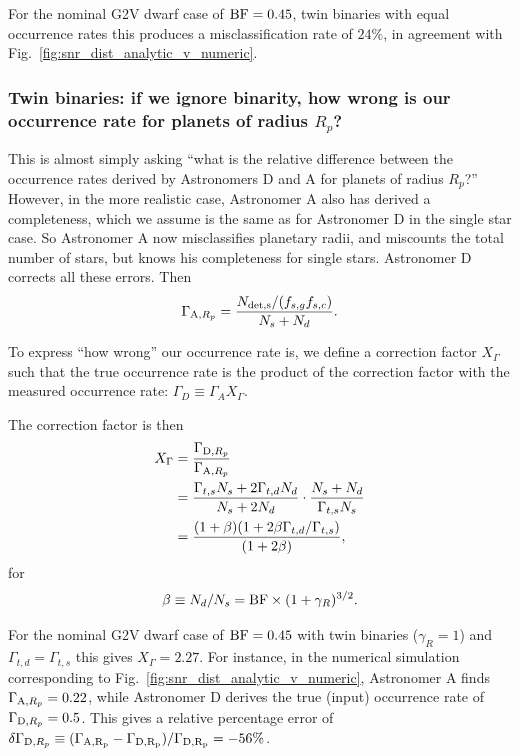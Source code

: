 \documentclass{emulateapj}
\begin{document}
For the nominal G2V dwarf case of ${\rm BF}=0.45$, twin binaries with equal 
occurrence rates this produces a misclassification rate of $24\%$, in agreement 
with Fig.~\ref{fig:snr_dist_analytic_v_numeric}.

\subsubsection{Twin binaries: if we ignore binarity, how wrong is our
occurrence rate for planets of radius $R_p$?}

This is almost simply asking ``what is the relative difference between the 
occurrence rates derived by Astronomers D and A for planets of radius $R_p$?''
However, in the more realistic case, Astronomer A also has derived a 
completeness, which we assume is the same as for Astronomer D in the single 
star case.
So Astronomer A now misclassifies planetary radii, and miscounts the total 
number of stars, but knows his completeness for single stars.
Astronomer D corrects all these errors.
Then
\begin{equation}
\Gamma_{{\rm A}, R_p} = \frac{N_{\rm det,s}/(f_{s,g} f_{s,c})}{N_s + N_d}.
\end{equation}

To express ``how wrong'' our occurrence rate is, we define a correction factor 
$X_\Gamma$ such that the true occurrence rate is the product of the correction 
factor with the measured occurrence rate: $\Gamma_D \equiv \Gamma_A X_\Gamma$.

The correction factor is then
\begin{align}
X_\Gamma &=
\frac{\Gamma_{{\rm D},R_p}}{\Gamma_{{\rm A},R_p}} \\
&=
\frac{\Gamma_{t,s}N_s + 2\Gamma_{t,d}N_d}{N_s + 2N_d}  \cdot 
\frac{N_s + N_d}{\Gamma_{t,s} N_s } \\
&= 
\frac{(1 + \beta)(1 + 2 \beta \Gamma_{t,d}/\Gamma_{t,s})}{(1+2\beta)},
\end{align}
for
\begin{equation}
\beta \equiv N_d/N_s = {\rm BF} \times (1+\gamma_R)^{3/2}.
\end{equation}

For the nominal G2V dwarf case of ${\rm BF}=0.45$ with twin binaries ($\gamma_R 
= 1$) and $\Gamma_{t,d} = \Gamma_{t,s}$ this gives $X_\Gamma = 2.27$.
For instance, in the numerical simulation corresponding to 
Fig.~\ref{fig:snr_dist_analytic_v_numeric}, Astronomer A finds 
$\Gamma_{{\rm A},R_p} = 0.22$, while Astronomer 
D derives the true (input) occurrence rate of $\Gamma_{{\rm D},R_p} = 0.5$.
This gives a relative percentage error of $\delta\Gamma_{{\rm D},R_p} \equiv 
(\Gamma_{\rm A,R_p} - \Gamma_{\rm D,R_p}) / \Gamma_{\rm D,R_p} = -56\%$.
\end{document}
